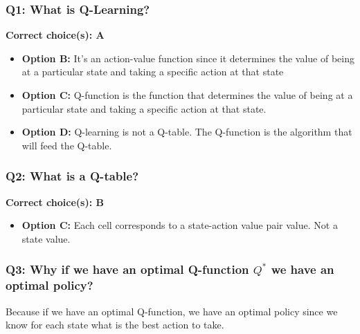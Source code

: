 \documentclass[11pt,a4paper]{article}
\begin{document}
\subsubsection{Q1: What is Q-Learning?}\label{q1-what-is-q-learning-1}

\textbf{Correct choice(s): A}

\begin{itemize}
\item
  \textbf{Option B:} It's an action-value function since it determines the value of being at a particular state and taking a specific action at that state
\item
  \textbf{Option C:} Q-function is the function that determines the value of being at a particular state and taking a specific action at that state.
\item
  \textbf{Option D:} Q-learning is not a Q-table. The Q-function is the algorithm that will feed the Q-table.
\end{itemize}

\subsubsection{Q2: What is a Q-table?}\label{q2-what-is-a-q-table-1}

\textbf{Correct choice(s): B}

\begin{itemize}
\tightlist
\item
  \textbf{Option C:} Each cell corresponds to a state-action value pair value. Not a state value.
\end{itemize}

\subsubsection{\texorpdfstring{Q3: Why if we have an optimal Q-function \(Q^*\) we have an optimal policy?}{Q3: Why if we have an optimal Q-function Q\^{}* we have an optimal policy?}}\label{q3-why-if-we-have-an-optimal-q-function-q-we-have-an-optimal-policy-1}

Because if we have an optimal Q-function, we have an optimal policy since we know for each state what is the best action to take.

\end{document}
